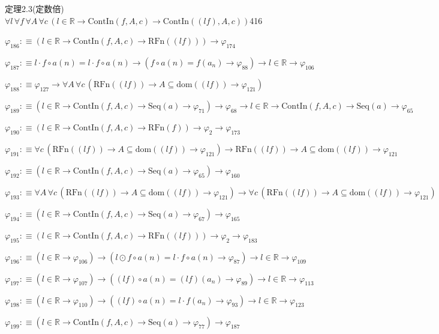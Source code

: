 \begin{fullproof}{定理2.3(定数倍)}{$\forall l\,\forall f\,\forall A\,\forall c\,(l \in \mathbb{R} \to \mathrm{ContIn}(f,A,c) \to \mathrm{ContIn}((l f),A,c))$}{416}
\begin{abbrevlist}
\item $\varphi_{186} :\equiv (l \in \mathbb{R} \to \mathrm{ContIn}(f,A,c) \to \mathrm{RFn}((l f))) \to \varphi_{174}$
\item $\varphi_{187} :\equiv l \cdot f \circ a(n) = l \cdot f \circ a(n) \to (f \circ a(n) = f(a_{n}) \to \varphi_{88}) \to l \in \mathbb{R} \to \varphi_{106}$
\item $\varphi_{188} :\equiv \varphi_{127} \to \forall A\,\forall c\,(\mathrm{RFn}((l f)) \to A \subseteq \mathrm{dom}((l f)) \to \varphi_{121})$
\item $\varphi_{189} :\equiv (l \in \mathbb{R} \to \mathrm{ContIn}(f,A,c) \to \mathrm{Seq}(a) \to \varphi_{71}) \to \varphi_{68} \to l \in \mathbb{R} \to \mathrm{ContIn}(f,A,c) \to \mathrm{Seq}(a) \to \varphi_{65}$
\item $\varphi_{190} :\equiv (l \in \mathbb{R} \to \mathrm{ContIn}(f,A,c) \to \mathrm{RFn}(f)) \to \varphi_{2} \to \varphi_{173}$
\item $\varphi_{191} :\equiv \forall c\,(\mathrm{RFn}((l f)) \to A \subseteq \mathrm{dom}((l f)) \to \varphi_{121}) \to \mathrm{RFn}((l f)) \to A \subseteq \mathrm{dom}((l f)) \to \varphi_{121}$
\item $\varphi_{192} :\equiv (l \in \mathbb{R} \to \mathrm{ContIn}(f,A,c) \to \mathrm{Seq}(a) \to \varphi_{65}) \to \varphi_{160}$
\item $\varphi_{193} :\equiv \forall A\,\forall c\,(\mathrm{RFn}((l f)) \to A \subseteq \mathrm{dom}((l f)) \to \varphi_{121}) \to \forall c\,(\mathrm{RFn}((l f)) \to A \subseteq \mathrm{dom}((l f)) \to \varphi_{121})$
\item $\varphi_{194} :\equiv (l \in \mathbb{R} \to \mathrm{ContIn}(f,A,c) \to \mathrm{Seq}(a) \to \varphi_{67}) \to \varphi_{165}$
\item $\varphi_{195} :\equiv (l \in \mathbb{R} \to \mathrm{ContIn}(f,A,c) \to \mathrm{RFn}((l f))) \to \varphi_{2} \to \varphi_{183}$
\item $\varphi_{196} :\equiv (l \in \mathbb{R} \to \varphi_{106}) \to (l \odot f \circ a(n) = l \cdot f \circ a(n) \to \varphi_{87}) \to l \in \mathbb{R} \to \varphi_{109}$
\item $\varphi_{197} :\equiv (l \in \mathbb{R} \to \varphi_{107}) \to ((l f) \circ a(n) = (l f)(a_{n}) \to \varphi_{89}) \to l \in \mathbb{R} \to \varphi_{113}$
\item $\varphi_{198} :\equiv (l \in \mathbb{R} \to \varphi_{110}) \to ((l f) \circ a(n) = l \cdot f(a_{n}) \to \varphi_{93}) \to l \in \mathbb{R} \to \varphi_{123}$
\item $\varphi_{199} :\equiv (l \in \mathbb{R} \to \mathrm{ContIn}(f,A,c) \to \mathrm{Seq}(a) \to \varphi_{77}) \to \varphi_{187}$

\end{abbrevlist}
\end{fullproof}
